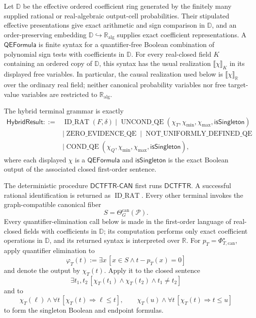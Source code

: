 Let \(\mathbb D\) be the effective ordered coefficient ring generated by the finitely many supplied rational or real-algebraic output-cell probabilities.  Their stipulated effective presentations give exact arithmetic and sign comparison in \(\mathbb D\), and an order-preserving embedding \(\mathbb D\hookrightarrow\mathbb R_{\mathrm{alg}}\) supplies exact coefficient representations.  A \(\mathsf{QEFormula}\) is finite syntax for a quantifier-free Boolean combination of polynomial sign tests with coefficients in \(\mathbb D\).  For every real-closed field \(K\) containing an ordered copy of \(\mathbb D\), this syntax has the usual realization \(\llbracket\chi\rrbracket_K\) in its displayed free variables.  In particular, the causal realization used below is \(\llbracket\chi\rrbracket_{\mathbb R}\) over the ordinary real field; neither canonical probability variables nor free target-value variables are restricted to \(\mathbb R_{\mathrm{alg}}\).

The hybrid terminal grammar is exactly
\[
\begin{split}
\mathsf{HybridResult}::={}&
\operatorname{ID\_RAT}(F,\delta)
\mid\operatorname{UNCOND\_QE}(\chi_T,\chi_{\min},\chi_{\max},\mathsf{isSingleton})\\
&\mid\operatorname{ZERO\_EVIDENCE\_QE}
\mid\operatorname{NOT\_UNIFORMLY\_DEFINED\_QE}\\
&\mid\operatorname{COND\_QE}(\chi_Q,\chi_{\min},\chi_{\max},\mathsf{isSingleton}),
\end{split}
\tag{1}
\]
where each displayed \(\chi\) is a \(\mathsf{QEFormula}\) and \(\mathsf{isSingleton}\) is the exact Boolean output of the associated closed first-order sentence.

The deterministic procedure \(\mathsf{DCTFTR\text{-}CAN}\) first runs \(\mathsf{DCTFTR}\).  A successful rational identification is returned as \(\operatorname{ID\_RAT}\).  Every other terminal invokes the graph-compatible canonical fiber
\[
S=\Theta_G^{\mathrm{can}}(\mathcal P).
\]
Every quantifier-elimination call below is made in the first-order language of real-closed fields with coefficients in \(\mathbb D\); its computation performs only exact coefficient operations in \(\mathbb D\), and its returned syntax is interpreted over \(\mathbb R\).  For \(p_T=\Phi_{T,\mathrm{can}}^\star\), apply quantifier elimination to
\[
\varphi_T(t):=\exists x\,[x\in S\wedge t-p_T(x)=0]
\tag{2}
\]
and denote the output by \(\chi_T(t)\).  Apply it to the closed sentence
\[
\exists t_1,t_2\,[\chi_T(t_1)\wedge\chi_T(t_2)\wedge t_1\ne t_2]
\tag{3}
\]
and to
\[
\chi_T(\ell)\wedge\forall t\,[\chi_T(t)\Longrightarrow\ell\leq t],
\qquad
\chi_T(u)\wedge\forall t\,[\chi_T(t)\Longrightarrow t\leq u]
\tag{4}
\]
to form the singleton Boolean and endpoint formulas.

